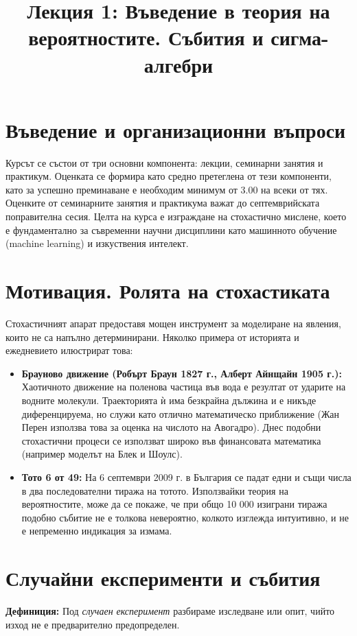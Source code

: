 \documentclass{article}
\title{Лекция 1: Въведение в теория на вероятностите. Събития и сигма-алгебри}
\author{}
\date{}
\begin{document}
\maketitle

\section{Въведение и организационни въпроси}
Курсът се състои от три основни компонента: лекции, семинарни занятия и практикум. Оценката се формира като средно претеглена от тези компоненти, като за успешно преминаване е необходим минимум от 3.00 на всеки от тях. Оценките от семинарните занятия и практикума важат до септемврийската поправителна сесия. Целта на курса е изграждане на стохастично мислене, което е фундаментално за съвременни научни дисциплини като машинното обучение (machine learning) и изкуствения интелект.

\section{Мотивация. Ролята на стохастиката}
Стохастичният апарат предоставя мощен инструмент за моделиране на явления, които не са напълно детерминирани. Няколко примера от историята и ежедневието илюстрират това:
\begin{itemize}
    \item \textbf{Брауново движение (Робърт Браун 1827 г., Алберт Айнщайн 1905 г.):} Хаотичното движение на поленова частица във вода е резултат от ударите на водните молекули. Траекторията ѝ има безкрайна дължина и е никъде диференцируема, но служи като отлично математическо приближение (Жан Перен използва това за оценка на числото на Авогадро). Днес подобни стохастични процеси се използват широко във финансовата математика (например моделът на Блек и Шоулс).
    \item \textbf{Тото 6 от 49:} На 6 септември 2009 г. в България се падат едни и същи числа в два последователни тиража на тотото. Използвайки теория на вероятностите, може да се покаже, че при общо 10 000 изиграни тиража подобно събитие не е толкова невероятно, колкото изглежда интуитивно, и не е непременно индикация за измама.
\end{itemize}

\section{Случайни експерименти и събития}
\textbf{Дефиниция:} Под \emph{случаен експеримент} разбираме изследване или опит, чийто изход не е предварително предопределен.
\end{document}
